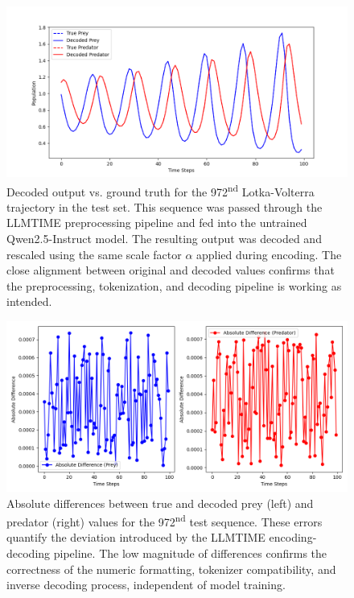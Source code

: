 \documentclass[a4paper,12pt]{article}
\begin{document}
\begin{figure}[ht]
    \centering
    \includegraphics[width=\textwidth]{true_vs_decoded.png}
    \caption{Decoded output vs. ground truth for the 972\textsuperscript{nd} Lotka-Volterra trajectory in the test set. This sequence was passed through the LLMTIME preprocessing pipeline and fed into the untrained Qwen2.5-Instruct model. The resulting output was decoded and rescaled using the same scale factor $\alpha$ applied during encoding. The close alignment between original and decoded values confirms that the preprocessing, tokenization, and decoding pipeline is working as intended.}
    \label{fig:true_vs_decoded}
  \end{figure}
  
  \begin{figure}[ht]
    \centering
    \includegraphics[width=\textwidth]{absolute_differences.png}
    \caption{Absolute differences between true and decoded prey (left) and predator (right) values for the 972\textsuperscript{nd} test sequence. These errors quantify the deviation introduced by the LLMTIME encoding-decoding pipeline. The low magnitude of differences confirms the correctness of the numeric formatting, tokenizer compatibility, and inverse decoding process, independent of model training.}
    \label{fig:absolute_differences}
  \end{figure}
  
\end{document}
